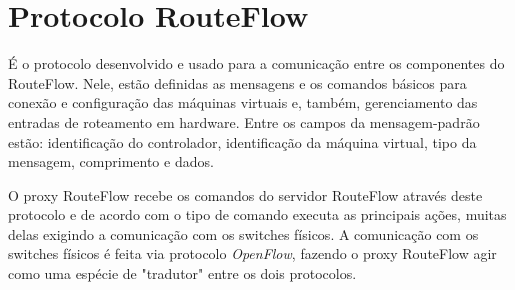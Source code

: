 \section{Protocolo RouteFlow}

É o protocolo desenvolvido e usado para a comunicação entre
os componentes do RouteFlow. Nele, estão definidas as
mensagens e os comandos básicos para conexão e configuração
das máquinas virtuais e, também, gerenciamento das entradas
de roteamento em hardware. Entre os campos da
mensagem-padrão estão: identificação do controlador,
identificação da máquina virtual, tipo da mensagem,
comprimento e dados. 

O proxy RouteFlow recebe os comandos do
servidor RouteFlow através deste protocolo e de acordo com o
tipo de comando executa as principais ações, muitas delas
exigindo a comunicação com os switches físicos. A
comunicação com os switches físicos é feita via protocolo
\textit{OpenFlow}, fazendo o proxy RouteFlow agir como
uma espécie de "tradutor" entre os dois protocolos.